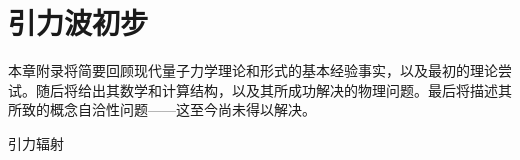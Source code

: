 \chapter{引力波初步}\label{chpt:wave}
本章附录将简要回顾现代量子力学理论和形式的基本经验事实，以及最初的理论尝试。随后将给出其数学和计算结构，以及其所成功解决的物理问题。最后将描述其所致的概念自洽性问题——这至今尚未得以解决。

引力辐射